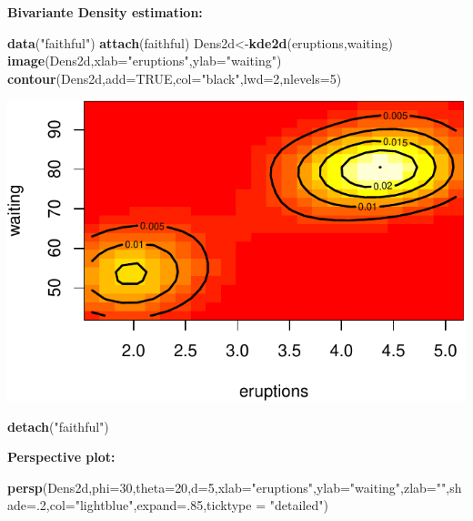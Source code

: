 \documentclass[]{article}
\newenvironment{Shaded}{\begin{snugshade}}{\end{snugshade}}
\newcommand{\KeywordTok}[1]{\textcolor[rgb]{0.13,0.29,0.53}{\textbf{{#1}}}}
\newcommand{\DataTypeTok}[1]{\textcolor[rgb]{0.13,0.29,0.53}{{#1}}}
\newcommand{\DecValTok}[1]{\textcolor[rgb]{0.00,0.00,0.81}{{#1}}}
\newcommand{\StringTok}[1]{\textcolor[rgb]{0.31,0.60,0.02}{{#1}}}
\newcommand{\OtherTok}[1]{\textcolor[rgb]{0.56,0.35,0.01}{{#1}}}
\newcommand{\NormalTok}[1]{{#1}}
\numberwithin{equation}{section}
\begin{document}
\textbf{Bivariante Density estimation:}

\begin{Shaded}
\begin{Highlighting}[]
\KeywordTok{data}\NormalTok{(}\StringTok{"faithful"}\NormalTok{)}
\KeywordTok{attach}\NormalTok{(faithful)}
\NormalTok{Dens2d<-}\KeywordTok{kde2d}\NormalTok{(eruptions,waiting)}
\KeywordTok{image}\NormalTok{(Dens2d,}\DataTypeTok{xlab=}\StringTok{"eruptions"}\NormalTok{,}\DataTypeTok{ylab=}\StringTok{"waiting"}\NormalTok{)}
\KeywordTok{contour}\NormalTok{(Dens2d,}\DataTypeTok{add=}\OtherTok{TRUE}\NormalTok{,}\DataTypeTok{col=}\StringTok{"black"}\NormalTok{,}\DataTypeTok{lwd=}\DecValTok{2}\NormalTok{,}\DataTypeTok{nlevels=}\DecValTok{5}\NormalTok{)}
\end{Highlighting}
\end{Shaded}

\includegraphics{index_files/figure-latex/unnamed-chunk-113-1.pdf}

\begin{Shaded}
\begin{Highlighting}[]
\KeywordTok{detach}\NormalTok{(}\StringTok{"faithful"}\NormalTok{)}
\end{Highlighting}
\end{Shaded}

\textbf{Perspective plot:}

\begin{Shaded}
\begin{Highlighting}[]
\KeywordTok{persp}\NormalTok{(Dens2d,}\DataTypeTok{phi=}\DecValTok{30}\NormalTok{,}\DataTypeTok{theta=}\DecValTok{20}\NormalTok{,}\DataTypeTok{d=}\DecValTok{5}\NormalTok{,}\DataTypeTok{xlab=}\StringTok{"eruptions"}\NormalTok{,}\DataTypeTok{ylab=}\StringTok{"waiting"}\NormalTok{,}\DataTypeTok{zlab=}\StringTok{""}\NormalTok{,}\DataTypeTok{shade=}\NormalTok{.}\DecValTok{2}\NormalTok{,}\DataTypeTok{col=}\StringTok{"lightblue"}\NormalTok{,}\DataTypeTok{expand=}\NormalTok{.}\DecValTok{85}\NormalTok{,}\DataTypeTok{ticktype =} \StringTok{"detailed"}\NormalTok{)}
\end{Highlighting}
\end{Shaded}
\end{document}
